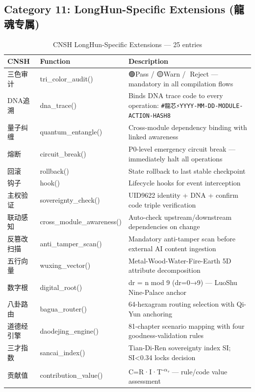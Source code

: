 \subsection{Category 11: LongHun-Specific Extensions (龍魂专属)}
\label{app:ren-longhun}

\begin{table}[h]
\centering
\caption{CNSH LongHun-Specific Extensions — 25 entries}
\renewcommand{\arraystretch}{1.2}
\fontsize{8}{10}\selectfont
\begin{tabular}{llp{6cm}}
\toprule
\textbf{CNSH} & \textbf{Function} & \textbf{Description} \\
\midrule
三色审计 & tri\_color\_audit() & 🟢Pass / 🟡Warn / 🔴Reject — mandatory in all compilation flows \\
DNA追溯 & dna\_trace() & Binds DNA trace code to every operation: \texttt{\#龍芯⚡️YYYY-MM-DD-MODULE-ACTION-HASH8} \\
量子纠缠 & quantum\_entangle() & Cross-module dependency binding with linked awareness \\
熔断 & circuit\_break() & P0-level emergency circuit break — immediately halt all operations \\
回滚 & rollback() & State rollback to last stable checkpoint \\
钩子 & hook() & Lifecycle hooks for event interception \\
主权验证 & sovereignty\_check() & UID9622 identity + DNA + confirm code triple verification \\
联动感知 & cross\_module\_awareness() & Auto-check upstream/downstream dependencies on change \\
反篡改扫描 & anti\_tamper\_scan() & Mandatory anti-tamper scan before external AI content ingestion \\
五行向量 & wuxing\_vector() & Metal-Wood-Water-Fire-Earth 5D attribute decomposition \\
数字根 & digital\_root() & dr = n mod 9 (dr=0→9) — LuoShu Nine-Palace anchor \\
八卦路由 & bagua\_router() & 64-hexagram routing selection with Qi-Yun anchoring \\
道德经引擎 & daodejing\_engine() & 81-chapter scenario mapping with four goodness-validation rules \\
三才指数 & sancai\_index() & Tian-Di-Ren sovereignty index SI; SI<0.34 locks decision \\
贡献值 & contribution\_value() & C=R·I·T\textsuperscript{-$\alpha_\tau$} — rule/code value assessment \\

\end{tabular}
\end{table}
